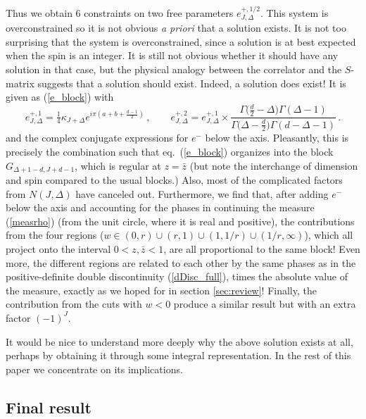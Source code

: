 \documentclass[11pt, reqno,preprint]{article}
\def\be{\begin{equation}}
\def\ee{\end{equation}}
\def\zbar{\bar{z}}
\def\j{J}
\begin{document}
Thus we obtain 6 constraints on two free parameters $e^{+,1/2}_{\j,\Delta}$.
This system is overconstrained so it is not obvious {\it a priori} that a solution exists.
It is not too surprising that the system is overconstrained, since a solution is at best expected when the spin is an integer.
It is still not obvious whether it should have any solution in that case, but the physical
analogy between the correlator and the $S$-matrix suggests that a solution should exist. Indeed, a solution does exist!
It is given as (\ref{e_block}) with
\be
 e^{+,1}_{\j,\Delta} = \tfrac14\kappa_{\j+\Delta} e^{i\pi(a+b+\frac{d-1}{2})}\,,\qquad
 e^{+,2}_{\j,\Delta}= e^{+,1}_{\j,\Delta}\times
 \frac{\Gamma\big(\tfrac{d}{2}-\Delta\big)\Gamma(\Delta-1)}{\Gamma\big(\Delta-\tfrac{d}{2}\big)\Gamma(d-\Delta-1)}\,.
\label{final_res}
\ee
and the complex conjugate expressions for $e^-$ below the axis.
Pleasantly, this is precisely the combination such that eq.~(\ref{e_block}) organizes into the block $G_{\Delta+1-d,\j+d-1}$, which is regular at $z=\zbar$
(but note the interchange of dimension and spin compared to the usual blocks.)
Also, most of the complicated factors from $N(\j,\Delta)$ have canceled out.
Furthermore, we find that, after adding $e^{-}$ below the axis and accounting for the phases in continuing the measure (\ref{measrho})
(from the unit circle, where it is real and positive),
the contributions from the four regions ($w\in (0,r)\cup (r,1)\cup(1,1/r)\cup(1/r,\infty)$), which all project onto the interval $0<z,\zbar<1$,
are all proportional to the same block!
Even more, the different regions are related to each other by the same phases as in the
positive-definite double discontinuity (\ref{dDisc_full}), times the absolute value of the measure,
exactly as we hoped for in section \ref{sec:review}!
Finally, the contribution from the cuts with $w<0$ produce a similar result but with an extra factor $(-1)^{\j}$.

It would be nice to understand more deeply why the above solution exists at all, perhaps by obtaining it through some
integral representation. %
In the rest of this paper we concentrate on its implications.

\subsection{Final result}
\end{document}
